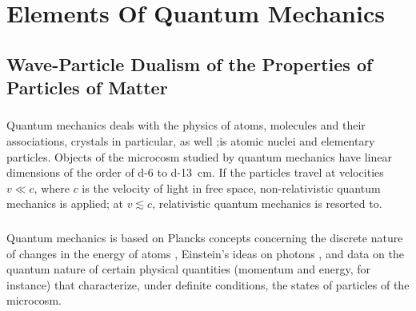 



\chapter{Elements Of Quantum Mechanics}
\label{ch-38}

\section[Wave-Particle Dualism]{Wave-Particle Dualism of the Properties of Particles of Matter}
\label{sec-38.1} 

\subsection{}\label{38.1.1} Quantum mechanics deals with the physics of atoms,
molecules and their associations, crystals in particular, as well ;is atomic nuclei and elementary particles. Objects of the microcosm studied by quantum mechanics have linear dimensions of the order of \num{d-6} to \SI{d-13}{\centi\meter}. If the particles travel at velocities
$v \ll c$, where $c$ is the velocity of light in free space, non-relativistic quantum mechanics is applied; at $v \lesssim c$, relativistic quantum mechanics is resorted to.

\subsection{}\label{38.1.2} Quantum mechanics is based on Plancks concepts concerning the discrete nature of changes in the energy of atoms , Einstein's ideas on photons , and data on the quantum nature of certain physical quantities (momentum and energy, for instance) that characterize, under definite conditions, the states of particles of the microcosm.

